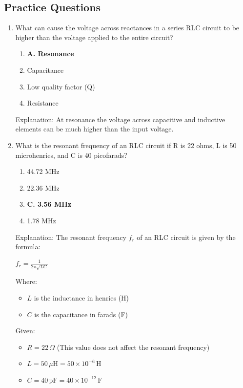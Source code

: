 \subsection*{Practice Questions}
\begin{enumerate}
  \item What can cause the voltage across reactances in a series RLC circuit to be higher than the voltage applied to the entire circuit?
    \begin{enumerate}
      \item \textbf{A. Resonance}
        \item  Capacitance
        \item  Low quality factor (Q)
        \item  Resistance
    \end{enumerate}
   \textcolor{myred}{Explanation:}
     At resonance the voltage across capacitive and inductive elements can be much higher than the input voltage.

   \item What is the resonant frequency of an RLC circuit if R is 22 ohms, L is 50 microhenries, and C is 40 picofarads?
     \begin{enumerate}
       \item  44.72 MHz
         \item  22.36 MHz
        \item \textbf{C. 3.56 MHz}
        \item  1.78 MHz
     \end{enumerate}
     \textcolor{myred}{Explanation:}
The resonant frequency $f_r$ of an RLC circuit is given by the formula:

$f_r = \frac{1}{2\pi\sqrt{LC}}$

Where:

\begin{itemize}
    \item $L$ is the inductance in henries (H)
    \item $C$ is the capacitance in farads (F)
\end{itemize}

Given:

\begin{itemize}
    \item $R = 22 \, \Omega$ (This value does not affect the resonant frequency)
    \item $L = 50 \, \mu\text{H} = 50 \times 10^{-6} \, \text{H}$
    \item $C = 40 \, \text{pF} = 40 \times 10^{-12} \, \text{F}$
\end{itemize}


\end{enumerate}
